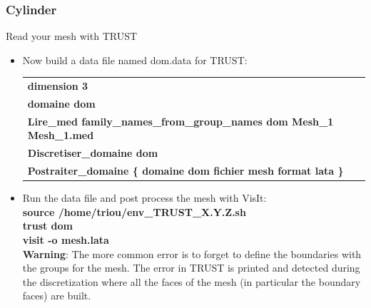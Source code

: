 \documentclass[10pt]{beamer}
\begin{document}
\begin{frame}
\frametitle{Cylinder}
\begin{block}{Read your mesh with TRUST}

\begin{itemize}
\item \label{read_mesh} Now build a data file named dom.data for TRUST:\\
\vspace{0.2cm}
\begin{tabular}{|l|}
\hline 
\textbf{dimension 3 }\tabularnewline
\textbf{domaine dom }\tabularnewline
\textbf{Lire\_med family\_names\_from\_group\_names dom Mesh\_1 Mesh\_1.med }\tabularnewline
\textbf{Discretiser\_domaine\index{discretiser\_domaine} dom }\tabularnewline
\textbf{Postraiter\_domaine\index{Postraiter\_domaine} \{ domaine dom fichier mesh format lata\index{format lata}
\}}\tabularnewline
\hline 
\end{tabular}

\item Run the data file and post process the mesh with VisIt:\\
\textbf{source  /home/triou/env\_TRUST\_X.Y.Z.sh} \\
\textbf{trust dom} \\
\textbf{visit -o mesh.lata} \\
\vspace{0.2cm}
\textbf{Warning}: The more common error is to forget to define the boundaries with the groups for the mesh. The error in TRUST is printed and detected during the discretization where all the faces of the mesh (in particular the boundary faces) are built.

\end{itemize}

\end{block}
\end{frame}
\end{document}
